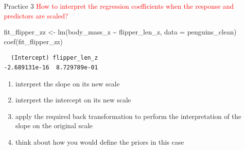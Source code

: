 \documentclass[
  10pt,
  ignorenonframetext,
  aspectratio=169,
  t]{beamer}
\newenvironment{Shaded}{\begin{snugshade}}{\end{snugshade}}
\newcommand{\AttributeTok}[1]{\textcolor[rgb]{0.40,0.45,0.13}{#1}}
\newcommand{\FunctionTok}[1]{\textcolor[rgb]{0.28,0.35,0.67}{#1}}
\newcommand{\NormalTok}[1]{\textcolor[rgb]{0.00,0.23,0.31}{#1}}
\newcommand{\OtherTok}[1]{\textcolor[rgb]{0.00,0.23,0.31}{#1}}
\newcommand{\SpecialCharTok}[1]{\textcolor[rgb]{0.37,0.37,0.37}{#1}}
\providecommand{\tightlist}{%
  \setlength{\itemsep}{0pt}\setlength{\parskip}{0pt}}
\begin{document}
\begin{frame}[fragile]{Practice 3}
\protect{}\label{practice-3}
\textcolor{red}{How to interpret the regression coefficients when the response and predictors are scaled?}

\footnotesize

\begin{Shaded}
\begin{Highlighting}[]
\NormalTok{fit\_flipper\_zz }\OtherTok{\textless{}{-}} \FunctionTok{lm}\NormalTok{(body\_mass\_z }\SpecialCharTok{\textasciitilde{}}\NormalTok{ flipper\_len\_z, }\AttributeTok{data =}\NormalTok{ penguins\_clean)}
\FunctionTok{coef}\NormalTok{(fit\_flipper\_zz)}
\end{Highlighting}
\end{Shaded}

\begin{verbatim}
  (Intercept) flipper_len_z 
-2.689131e-16  8.729789e-01 
\end{verbatim}

\normalsize

\begin{enumerate}
\tightlist
\item
  interpret the slope on its new scale
\item
  interpret the intercept on its new scale
\item
  apply the required back transformation to perform the interpretation
  of the slope on the original scale
\item
  think about how you would define the priors in this case
\end{enumerate}
\end{frame}
\end{document}
